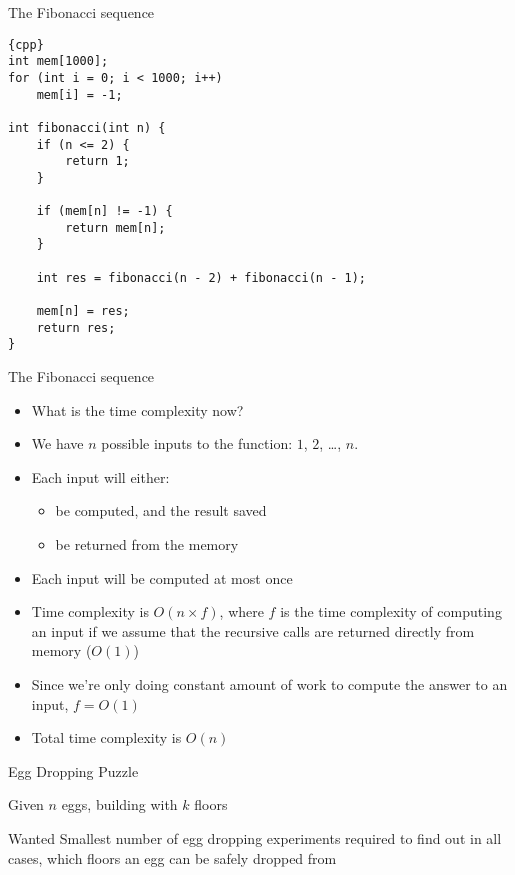\begin{frame}[fragile]{The Fibonacci sequence}

    \begin{lstlisting}[basicstyle=\footnotesize]{cpp}
int mem[1000];
for (int i = 0; i < 1000; i++)
    mem[i] = -1;

int fibonacci(int n) {
    if (n <= 2) {
        return 1;
    }

    if (mem[n] != -1) {
        return mem[n];
    }

    int res = fibonacci(n - 2) + fibonacci(n - 1);

    mem[n] = res;
    return res;
}
    \end{lstlisting}

\end{frame}

\begin{frame}[fragile]{The Fibonacci sequence}
    \begin{itemize}
        \item What is the time complexity now?
        \item We have $n$ possible inputs to the function: $1$, $2$, \ldots, $n$.
        \item Each input will either:
            \begin{itemize}
                \item be computed, and the result saved
                \item be returned from the memory
            \end{itemize}
        \item Each input will be computed at most once
        \item Time complexity is $O(n \times f)$, where $f$ is the time complexity of computing an input if we assume that the recursive calls are returned directly from memory ($O(1)$)
        \item Since we're only doing constant amount of work to compute the answer to an input, $f = O(1)$
        \item Total time complexity is $O(n)$
    \end{itemize}
\end{frame}

\begin{frame}{Egg Dropping Puzzle}
\begin{block}{Given}
$n$ eggs, building with $k$ floors
\end{block}

\begin{block}{Wanted}
Smallest number of egg dropping experiments required
to find out in all cases,
which floors an egg can be safely dropped from
\end{block}

\end{frame}

